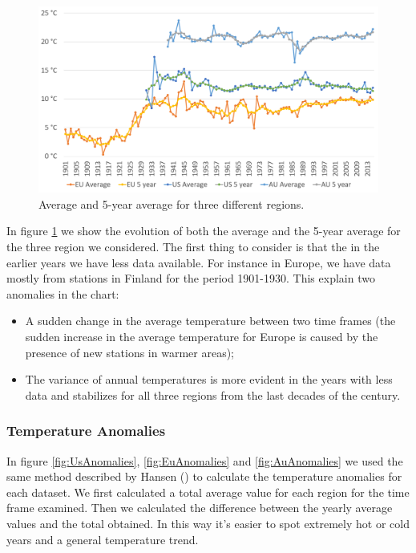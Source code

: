 \documentclass{vldb}
\begin{document}
\begin{figure}[tbh]
\includegraphics[width=1\linewidth]{averageRegions}
\caption{Average and 5-year average for three different regions.}
\label{fig:averageRegions}
\end{figure}

In figure \ref{fig:averageRegions} we show the evolution of both the average and the 5-year average for the three region we considered. The first thing to consider is that the in the earlier years we have less data available. For instance in Europe, we have data mostly from stations in Finland for the period 1901-1930. This explain two anomalies in the chart:
\begin{itemize}
    \item A sudden change in the average temperature between two time frames (the sudden increase in the average temperature for Europe is caused by the presence of new stations in warmer areas);
    \item The variance of annual temperatures is more evident in the years with less data and stabilizes for all three regions from the last decades of the century.
\end{itemize}

\subsubsection{Temperature Anomalies}
In figure \ref{fig:UsAnomalies}, \ref{fig:EuAnomalies} and \ref{fig:AuAnomalies} we used the same method described by Hansen (\cite{hansen1999giss}) to calculate the temperature anomalies for each dataset. We first calculated a total average value for each region for the time frame examined. Then we calculated the difference between the yearly average values and the total obtained. In this way it's easier to spot extremely hot or cold years and a general temperature trend. 
\end{document}
